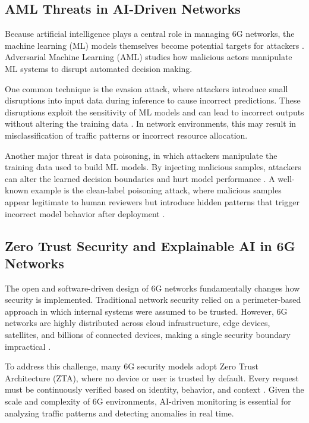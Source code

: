 \documentclass[letterpaper]{article} %
\begin{document}
\subsection{AML Threats in AI-Driven Networks}

Because artificial intelligence plays a central role in managing 6G networks, the machine learning (ML) models themselves become potential targets for attackers \cite{Catak_Catak_Moldsvor_2021}. Adversarial Machine Learning (AML) studies how malicious actors manipulate ML systems to disrupt automated decision making.

One common technique is the evasion attack, where attackers introduce small disruptions into input data during inference to cause incorrect predictions. These disruptions exploit the sensitivity of ML models and can lead to incorrect outputs without altering the training data \cite{Catak_Catak_Moldsvor_2021}. In network environments, this may result in misclassification of traffic patterns or incorrect resource allocation.

Another major threat is data poisoning, in which attackers manipulate the training data used to build ML models. By injecting malicious samples, attackers can alter the learned decision boundaries and hurt model performance \cite{Chen_Zhang_Zhang_Wang_Liu_2021}. A well-known example is the clean-label poisoning attack, where malicious samples appear legitimate to human reviewers but introduce hidden patterns that trigger incorrect model behavior after deployment \cite{NEURIPS2018_22722a34}.

\subsection{Zero Trust Security and Explainable AI in 6G Networks}

The open and software-driven design of 6G networks fundamentally changes how security is implemented. Traditional network security relied on a perimeter-based approach in which internal systems were assumed to be trusted. However, 6G networks are highly distributed across cloud infrastructure, edge devices, satellites, and billions of connected devices, making a single security boundary impractical \cite{kaur2025}. 

To address this challenge, many 6G security models adopt Zero Trust Architecture (ZTA), where no device or user is trusted by default. Every request must be continuously verified based on identity, behavior, and context \cite{ali2025, kaur2025}. Given the scale and complexity of 6G environments, AI-driven monitoring is essential for analyzing traffic patterns and detecting anomalies in real time.
\end{document}
